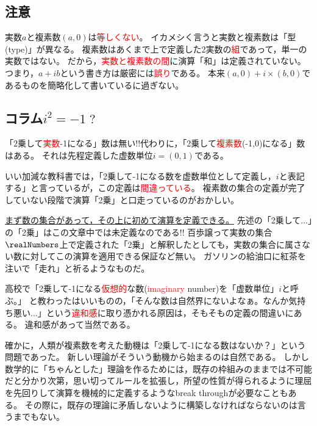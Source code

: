         \subsection{注意}
            実数$a$と複素数$(a,0)$は\textcolor{red}{等しくない}。
            イカメシく言うと実数と複素数は「型(type)」が異なる。
            複素数はあくまで上で定義した2実数の\textcolor{red}{組}であって，単一の実数ではない。
            だから，\textcolor{red}{実数と複素数の間}に演算「和」は定義されていない。
            つまり，$a+ib$という書き方は厳密には\textcolor{red}{誤り}である。
            本来$(a,0)+i\times(b,0)$であるものを簡略化して書いているに過ぎない。
        \subsection{コラム\texorpdfstring{$i^2=-1\;?$}{虚数単位の2乗は-1?}}
            「2乗して\textcolor{red}{実数}-1になる」数は無い!!代わりに，「2乗して\textcolor{red}{複素数}(-1,0)になる」数はある。
            それは先程定義した虚数単位$i=(0,1)$である。
            \par
            いい加減な教科書では，「2乗して-1になる数を虚数単位として定義し，$i$と表記する」と言っているが，この定義は\textcolor{red}{間違っている}。
            複素数の集合の定義が完了していない段階で演算「2乗」と口走っているのがおかしい。
            \par
            \underline{まず数の集合があって，その上に初めて演算を定義できる。}
            先述の「2乗して...」の「2乗」はこの文章中では未定義なのである!!
            百歩譲って実数の集合$\realNumbers$上で定義された「2乗」と解釈したとしても，実数の集合に属さない数に対してこの演算を適用できる保証など無い。
            ガソリンの給油口に紅茶を注いで「走れ」と祈るようなものだ。
            \par
            高校で「2乗して-1になる\textcolor{red}{仮想的}な数(\textcolor{red}{imaginary} number)を「虚数単位」$i$と呼ぶ。」
            と教わったはいいものの，「そんな数は自然界にないよなぁ。なんか気持ち悪い...」という\textcolor{red}{違和感}に取り憑かれる原因は，そもそもの定義の間違いにある。
            違和感があって当然である。
            \par
            確かに，人類が複素数を考えた動機は「2乗して-1になる数はないか？」という問題であった。
            新しい理論がそういう動機から始まるのは自然である。
            しかし数学的に「ちゃんとした」理論を作るためには，既存の枠組みのままでは不可能だと分かり次第，思い切ってルールを拡張し，所望の性質が得られるように理屈を先回りして演算を機械的に定義するようなbreak throughが必要なこともある。
            その際に，既存の理論に矛盾しないように構築しなければならないのは言うまでもない。
